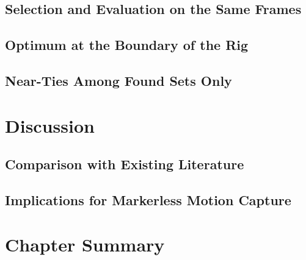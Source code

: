 \subsection{Selection and Evaluation on the Same Frames}

\subsection{Optimum at the Boundary of the Rig}

\subsection{Near-Ties Among Found Sets Only}

\section{Discussion}
\label{sec:discussion}

\subsection{Comparison with Existing Literature}
\cite{rahimian2016optimal, jorgensen2018simulation, yang2025evaluation, kwak2025assessing, samani2026optimizing}

\subsection{Implications for Markerless Motion Capture}

\section{Chapter Summary}
\label{sec:resultssummary}
